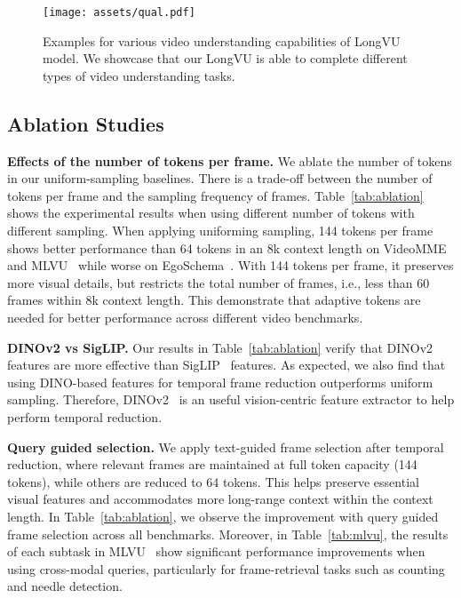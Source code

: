 \begin{figure}
    \centering
    \texttt{[image: assets/qual.pdf]}
    \caption{Examples for various video understanding capabilities of LongVU model. We showcase that our LongVU is able to complete different types of video understanding tasks.}
    \label{fig:qual}
\end{figure}

\subsection{Ablation Studies}
\label{sec:ablation}

\noindent\textbf{Effects of the number of tokens per frame.} We ablate the number of tokens in our uniform-sampling baselines. There is a trade-off between the number of tokens per frame and the sampling frequency of frames. Table~\ref{tab:ablation} shows the experimental results when using different number of tokens with different sampling. When applying uniforming sampling, 144 tokens per frame shows better performance than 64 tokens in an 8k context length on VideoMME~\citep{fu2024video} and MLVU~\cite{zhou2024mlvu} while worse on EgoSchema~\cite{mangalam2024egoschema}. With 144 tokens per frame, it preserves more visual details, but restricts the total number of frames, i.e., less than 60 frames within 8k context length. This demonstrate that adaptive tokens are needed for better performance across different video benchmarks. 

\noindent\textbf{DINOv2 vs SigLIP.}  Our results in Table~\ref{tab:ablation} verify that DINOv2~\citep{oquab2023dinov2} features are more effective than SigLIP~\citep{zhai2023sigmoid} features. As expected, we also find that using DINO-based features for temporal frame reduction outperforms uniform sampling. Therefore, DINOv2~\citep{oquab2023dinov2} is an useful vision-centric feature extractor to help perform  temporal reduction. 

\noindent\textbf{Query guided selection.} We apply text-guided frame selection after temporal reduction, where relevant frames are maintained at full token capacity (144 tokens), while others are reduced to 64 tokens. This helps preserve essential visual features and accommodates more long-range context within the context length. In Table~\ref{tab:ablation}, we observe the improvement with query guided frame selection across all benchmarks. Moreover, in Table~\ref{tab:mlvu}, the results of each subtask in  MLVU~\citep{zhou2024mlvu} show significant performance improvements when using cross-modal queries, particularly for frame-retrieval tasks such as counting and needle detection. 


